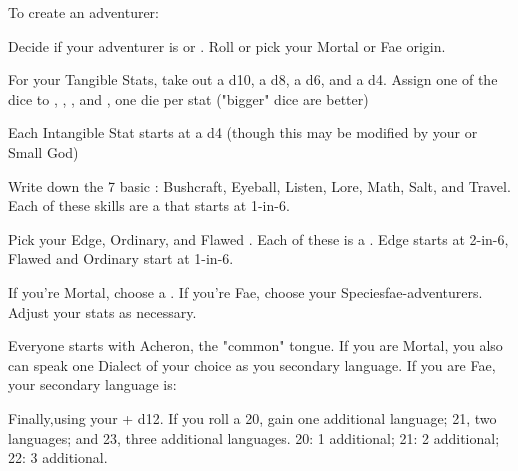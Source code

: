 {\newpage


To create an adventurer:


Decide if your adventurer is  or .  Roll or pick your Mortal or Fae origin.


For your Tangible Stats, take out a d10, a d8, a d6, and a d4.  Assign one of the dice to \VIG, \DEX, \INT, and \FOC, one die per stat ("bigger" dice are better)

Each Intangible Stat starts at a d4 (though this may be modified by your  or Small God)


Write down the 7 basic : Bushcraft, Eyeball, Listen, Lore, Math, Salt, and Travel.  Each of these skills are a \KNACK that starts at 1-in-6.


Pick your Edge, Ordinary, and Flawed .  Each of these is a \KNACK.  Edge starts at 2-in-6, Flawed and Ordinary start at 1-in-6.

\cbreak


If you're Mortal, choose a .  If you're Fae, choose your {Species}{fae-adventurers}. Adjust your stats as necessary.


Everyone starts with Acheron, the "common" tongue. If you are Mortal, you also can speak one Dialect of your choice as you secondary language.  If you are Fae, your secondary language is:

Finally,\RO using your \INT + d12.  If you roll a 20, gain one additional language; 21, two languages; and 23, three additional languages. 20: 1 additional; 21: 2 additional; 22: 3 additional.

}
